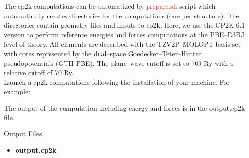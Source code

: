 \documentclass[12pt]{article}
\begin{document}
The cp2k computations can be automatized by \textcolor{red}{prepare.sh} script which automatically creates directories for the computations (one per structure). The directories contain geometry files and inputs to cp2k. Here, we use the CP2K 6.1 version to perform reference energies and forces computations at the PBE--D3BJ level of theory. All elements are described with the TZV2P--MOLOPT basis set with cores represented by the dual--space Goedecker--Teter--Hutter pseudopotentials (GTH PBE). The plane--wave cutoff is set to 700 Ry with a relative cutoff of 70 Ry.\\

Launch a cp2k computations following the installation of your machine. For example:
\begin{center}
\end{center}
The output of the computation including energy and forces is in the output.cp2k file.
\\
\begin{mybox3}{Output Files}
\begin{itemize}
    \item \textbf{output.cp2k} 
\end{itemize}
\end{mybox3}
%
\end{document}
